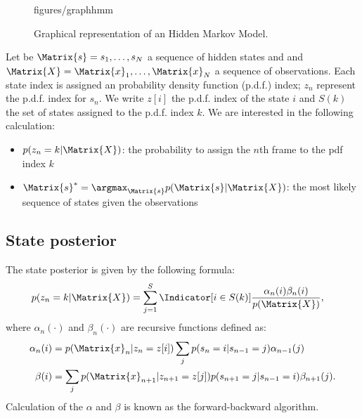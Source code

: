 \documentclass[class=article, crop=false]{standalone}
\begin{document}
\begin{figure}[t]
    \centering
    {figures/graphhmm}
    \caption{Graphical representation of an Hidden Markov Model.}
    \label{fig:graph_hmm}
\end{figure}

Let be $\Matrix{s} = s_1, \dots, s_N$ a sequence of hidden states and
and $\Matrix{X} = \Matrix{x}_1, \dots, \Matrix{x}_N$ a sequence of
observations. Each state index is assigned an probability density
function (p.d.f.) index; $z_n$ represent the p.d.f. index for $s_n$.
We write $z[i]$ the p.d.f. index of the state $i$ and $S(k)$ the set
of states assigned to the p.d.f. index $k$.  We are interested in the
following calculation:
\begin{itemize}
    \item{
        $p(z_n = k | \Matrix{X})$: the probability to assign the $n$th
        frame to the pdf index $k$
    }
    \item {
        $\Matrix{s}^* = \argmax_{\Matrix{s}} p(\Matrix{s} | \Matrix{X})$:
        the most likely sequence of states given the observations
    }
\end{itemize}

\subsection{State posterior}

The state posterior is given by the following formula:
\begin{align}
    p(z_n = k | \Matrix{X}) &= \sum_{j=1}^S \Indicator[i \in S(k)] \frac{\alpha_n(i) \beta_n(i)}
        {p(\Matrix{X})} \label{eq:statepost},
\end{align}
where $\alpha_n(\cdot)$ and $\beta_n(\cdot)$ are recursive functions
defined as:
\begin{align}
    \alpha_n(i) &= p(\Matrix{x}_n| z_n = z[i]) \sum_j
        p(s_n = i | s_{n-1} = j) \alpha_{n-1}(j) \label{eq:forward}\\
    \beta(i) &= \sum_j p(\Matrix{x}_{n+1} | z_{n+1} = z[j])
        p(s_{n+1} = j | s_{n-1} = i) \beta_{n+1}(j) \label{eq:backward}.
\end{align}
Calculation of the $\alpha$ and $\beta$ is known as the
forward-backward algorithm.
\end{document}
